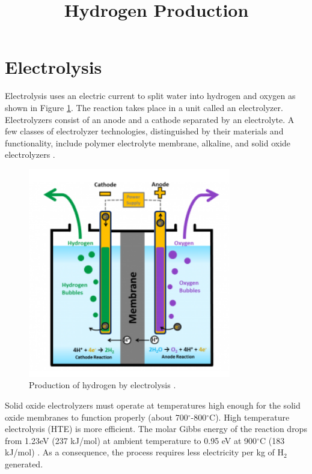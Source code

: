 \documentclass[11pt,letterpaper]{article}
\title{Hydrogen Production}
\begin{document}

\section{Electrolysis}

Electrolysis uses an electric current to split water into hydrogen and oxygen as shown in Figure \ref{fig:electro}.
The reaction takes place in a unit called an electrolyzer.
Electrolyzers consist of an anode and a cathode separated by an electrolyte.
A few classes of electrolyzer technologies, distinguished by their materials and functionality, include polymer electrolyte membrane, alkaline, and solid oxide electrolyzers \cite{doe_office_of_energy_efficiency_and_renewable_energy_hydrogen_2020}.

\begin{figure}[]
	\centering
	\includegraphics[width=0.55\linewidth]{figures/electrolysis.png}
	\hfill
	\caption{Production of hydrogen by electrolysis \cite{doe_office_of_energy_efficiency_and_renewable_energy_hydrogen_2020}.}
	\label{fig:electro}
\end{figure}

Solid oxide electrolyzers must operate at temperatures high enough for the solid oxide membranes to function properly (about 700$^{\circ}$-800$^{\circ}$C).
High temperature electrolysis (HTE) is more efficient.
The molar Gibbs energy of the reaction drops from 1.23eV (237 kJ/mol) at ambient temperature to 0.95 eV at 900$^{\circ}$C (183 kJ/mol) \cite{helmeth_high_2020}.
As a consequence, the process requires less electricity per kg of H$_2$ generated.
\end{document}
